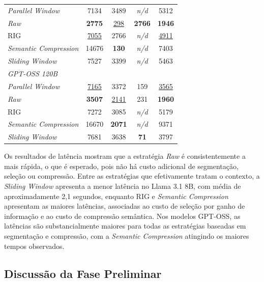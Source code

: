 \begin{table}[htbp]
\begin{tabular}{lccc|c}
\textit{Parallel Window}      & 7134          & 3489             & \textit{n/d}  & 5312 \\
\textit{Raw}                  & \textbf{2775} & \underline{298}  & \textbf{2766} & \textbf{1946} \\
RIG                           & \underline{7055} & 2766          & \textit{n/d}  & \underline{4911} \\
\textit{Semantic Compression} & 14676         & \textbf{130}     & \textit{n/d}  & 7403 \\
\textit{Sliding Window}       & 7527          & 3399             & \textit{n/d}  & 5463 \\
\midrule
\multicolumn{5}{l}{\textit{GPT-OSS 120B}} \\
\textit{Parallel Window}      & \underline{7165} & 3372          & 159          & \underline{3565} \\
\textit{Raw}                  & \textbf{3507} & \underline{2141} & 231          & \textbf{1960} \\
RIG                           & 7272          & 3085             & \textit{n/d} & 5179 \\
\textit{Semantic Compression} & 16670         & \textbf{2071}    & \textit{n/d} & 9371 \\
\textit{Sliding Window}       & 7681          & 3638             & \textbf{71}  & 3797 \\
\bottomrule
\end{tabular}
\end{table}

Os resultados de latência mostram que a estratégia \textit{Raw} é consistentemente a mais rápida, o que é esperado, pois não há custo adicional de segmentação, seleção ou compressão. Entre as estratégias que efetivamente tratam o contexto, a \textit{Sliding Window} apresenta a menor latência no Llama 3.1 8B, com média de aproximadamente 2,1 segundos, enquanto RIG e \textit{Semantic Compression} apresentam as maiores latências, associadas ao custo de seleção por ganho de informação e ao custo de compressão semântica. Nos modelos GPT-OSS, as latências são substancialmente maiores para todas as estratégias baseadas em segmentação e compressão, com a \textit{Semantic Compression} atingindo os maiores tempos observados.

\subsection{Discussão da Fase Preliminar}
\label{subsec:discussao-fase-preliminar}

